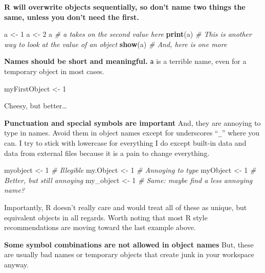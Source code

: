 \documentclass[
]{book}
\newenvironment{Shaded}{\begin{snugshade}}{\end{snugshade}}
\newcommand{\CommentTok}[1]{\textcolor[rgb]{0.56,0.35,0.01}{\textit{#1}}}
\newcommand{\DecValTok}[1]{\textcolor[rgb]{0.00,0.00,0.81}{#1}}
\newcommand{\KeywordTok}[1]{\textcolor[rgb]{0.13,0.29,0.53}{\textbf{#1}}}
\newcommand{\NormalTok}[1]{#1}
\newcommand{\StringTok}[1]{\textcolor[rgb]{0.31,0.60,0.02}{#1}}
\begin{document}
\textbf{R will overwrite objects sequentially, so don't name two things the same, unless you don't need the first.}

\begin{Shaded}
\begin{Highlighting}[]
\NormalTok{a <-}\StringTok{ }\DecValTok{1}
\NormalTok{a <-}\StringTok{ }\DecValTok{2}
\NormalTok{a }\CommentTok{# a takes on the second value here}
\KeywordTok{print}\NormalTok{(a) }\CommentTok{# This is another way to look at the value of an object}
\KeywordTok{show}\NormalTok{(a) }\CommentTok{# And, here is one more}
\end{Highlighting}
\end{Shaded}

\textbf{Names should be short and meaningful.} \texttt{a} is a terrible name, even for a temporary object in most cases.

\begin{Shaded}
\begin{Highlighting}[]
\NormalTok{myFirstObject <-}\StringTok{ }\DecValTok{1}
\end{Highlighting}
\end{Shaded}

Cheesy, but better\ldots{}

\textbf{Punctuation and special symbols are important} And, they are annoying to type in names. Avoid them in object names except for underscores ``\texttt{\_}'' where you can. I try to stick with lowercase for everything I do except built-in data and data from external files because it is a pain to change everything.

\begin{Shaded}
\begin{Highlighting}[]
\NormalTok{myobject <-}\StringTok{ }\DecValTok{1} \CommentTok{# Illegible}
\NormalTok{my.Object <-}\StringTok{ }\DecValTok{1} \CommentTok{# Annoying to type}
\NormalTok{myObject <-}\StringTok{ }\DecValTok{1} \CommentTok{# Better, but still annoying}
\NormalTok{my_object <-}\StringTok{ }\DecValTok{1} \CommentTok{# Same: maybe find a less annoying name?}
\end{Highlighting}
\end{Shaded}

Importantly, R doesn't really care and would treat all of these as unique, but equivalent objects in all regards. Worth noting that most R style recommendations are moving toward the last example above.

\textbf{Some symbol combinations are not allowed in object names} But, these are usually bad names or temporary objects that create junk in your workspace anyway.
\end{document}
